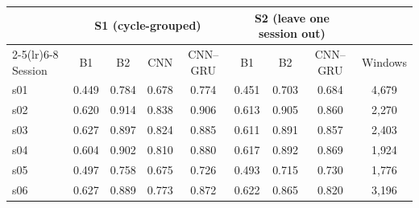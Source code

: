 \begin{tabular}{@{}lcccccccc@{}}
\toprule
 & \multicolumn{4}{c}{S1 (cycle-grouped)} & \multicolumn{3}{c}{S2 (leave one session out)} & \\
\cmidrule(lr){2-5}\cmidrule(lr){6-8}
Session & B1 & B2 & CNN & CNN--GRU & B1 & B2 & CNN--GRU & Windows \\
\midrule
s01 & 0.449 & 0.784 & 0.678 & 0.774 & 0.451 & 0.703 & 0.684 & 4{,}679 \\ %
s02 & 0.620 & 0.914 & 0.838 & 0.906 & 0.613 & 0.905 & 0.860 & 2{,}270 \\ %
s03 & 0.627 & 0.897 & 0.824 & 0.885 & 0.611 & 0.891 & 0.857 & 2{,}403 \\ %
s04 & 0.604 & 0.902 & 0.810 & 0.880 & 0.617 & 0.892 & 0.869 & 1{,}924 \\ %
s05 & 0.497 & 0.758 & 0.675 & 0.726 & 0.493 & 0.715 & 0.730 & 1{,}776 \\ %
s06 & 0.627 & 0.889 & 0.773 & 0.872 & 0.622 & 0.865 & 0.820 & 3{,}196 \\ %
\bottomrule
\end{tabular}
